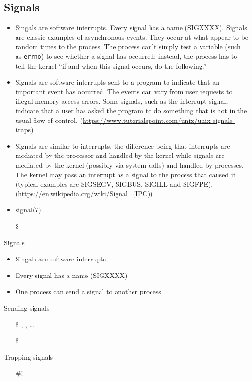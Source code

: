\subsection{Signals}
\label{sec:signals}

\begin{itemize}
\item Singals are software interrupts. Every signal has a name (SIGXXXX). Signals are
  classic examples of asynchronous events. They occur at what appear to be random times to
  the process. The process can't simply test a variable (such as \texttt{errno}) to see
  whether a signal has occurred; instead, the process has to tell the kernel ``if and when
  this signal occurs, do the following.'' 
\item Signals are software interrupts sent to a program to indicate that an important
  event has occurred. The events can vary from user requests to illegal memory access
  errors. Some signals, such as the interrupt signal, indicate that a user has asked the
  program to do something that is not in the usual flow of
  control. (\url{https://www.tutorialspoint.com/unix/unix-signals-traps})
\item Signals are similar to interrupts, the difference being that interrupts are mediated
  by the processor and handled by the kernel while signals are mediated by the kernel
  (possibly via system calls) and handled by processes. The kernel may pass an interrupt
  as a signal to the process that caused it (typical examples are SIGSEGV, SIGBUS, SIGILL
  and SIGFPE). (\url{https://en.wikipedia.org/wiki/Signal_(IPC)})
\item signal(7)
\item[\$] 
\end{itemize}

\begin{frame}{Signals}
  \begin{itemize}
  \item Singals are software interrupts
  \item Every signal has a name (SIGXXXX)
  \item One process can send a signal to another process
  \end{itemize}
  \begin{block}{Sending signals}
    \begin{itemize}
    \item[\$] \Cc, \Cz, \ldots
    \item[\$] 
    \end{itemize}
  \end{block}
  \begin{block}{Trapping signals}
    \begin{itemize}
    \item[\#!] 
    \end{itemize}
  \end{block}
\end{frame}

